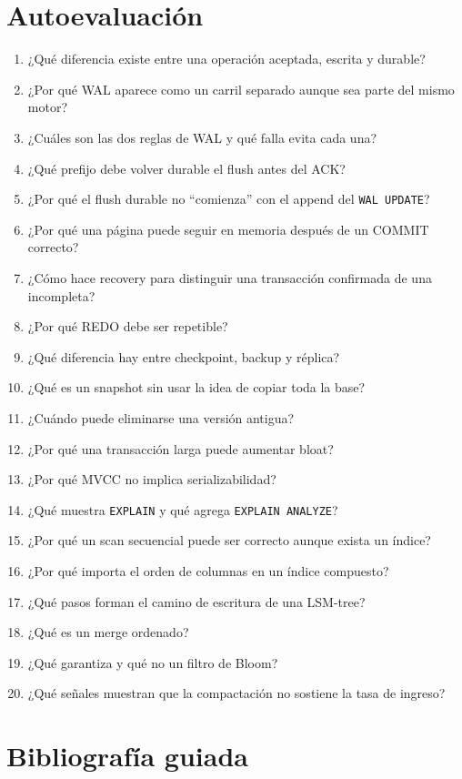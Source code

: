 \documentclass[variant=apuntes,cover=institutional,mode=screen]{ua-engineering-v6-article}
\begin{document}
\section{Autoevaluación}

\begin{enumerate}
\item ¿Qué diferencia existe entre una operación aceptada, escrita y durable?
\item ¿Por qué WAL aparece como un carril separado aunque sea parte del mismo motor?
\item ¿Cuáles son las dos reglas de WAL y qué falla evita cada una?
\item ¿Qué prefijo debe volver durable el flush antes del ACK?
\item ¿Por qué el flush durable no ``comienza'' con el append del \texttt{WAL UPDATE}?
\item ¿Por qué una página puede seguir en memoria después de un COMMIT correcto?
\item ¿Cómo hace recovery para distinguir una transacción confirmada de una incompleta?
\item ¿Por qué REDO debe ser repetible?
\item ¿Qué diferencia hay entre checkpoint, backup y réplica?
\item ¿Qué es un snapshot sin usar la idea de copiar toda la base?
\item ¿Cuándo puede eliminarse una versión antigua?
\item ¿Por qué una transacción larga puede aumentar bloat?
\item ¿Por qué MVCC no implica serializabilidad?
\item ¿Qué muestra \texttt{EXPLAIN} y qué agrega \texttt{EXPLAIN ANALYZE}?
\item ¿Por qué un scan secuencial puede ser correcto aunque exista un índice?
\item ¿Por qué importa el orden de columnas en un índice compuesto?
\item ¿Qué pasos forman el camino de escritura de una LSM-tree?
\item ¿Qué es un merge ordenado?
\item ¿Qué garantiza y qué no un filtro de Bloom?
\item ¿Qué señales muestran que la compactación no sostiene la tasa de ingreso?
\end{enumerate}

\section{Bibliografía guiada}
\end{document}
